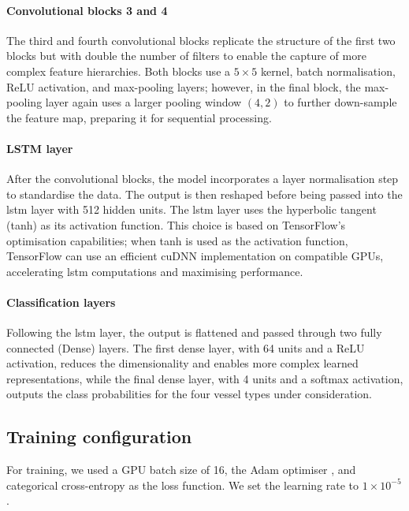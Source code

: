 \paragraph{Convolutional blocks 3 and 4} The third and fourth convolutional blocks replicate the structure of the first two blocks but with double the number of filters to enable the capture of more complex feature hierarchies. Both blocks use a $5\times5$ kernel, batch normalisation, ReLU activation, and max-pooling layers; however, in the final block, the max-pooling layer again uses a larger pooling window $(4, 2)$ to further down-sample the feature map, preparing it for sequential processing.

\paragraph{LSTM layer} After the convolutional blocks, the model incorporates a layer normalisation step to standardise the data. The output is then reshaped before being passed into the \acrshort{lstm} layer with 512 hidden units. The \acrshort{lstm} layer uses the hyperbolic tangent (tanh) as its activation function. This choice is based on TensorFlow's optimisation capabilities; when tanh is used as the activation function, TensorFlow can use an efficient cuDNN implementation on compatible GPUs, accelerating \acrshort{lstm} computations and maximising performance.

\paragraph{Classification layers} Following the \acrshort{lstm} layer, the output is flattened and passed through two fully connected (Dense) layers. The first dense layer, with 64 units and a ReLU activation, reduces the dimensionality and enables more complex learned representations, while the final dense layer, with 4 units and a softmax activation, outputs the class probabilities for the four vessel types under consideration.

\subsection{Training configuration}\label{subsec:training-configuration}

For training, we used a GPU batch size of 16, the Adam optimiser \cite{kingma_adam_2014}, and categorical cross-entropy as the loss function. We set the learning rate to $1 \times 10^{-5}$. 
 
